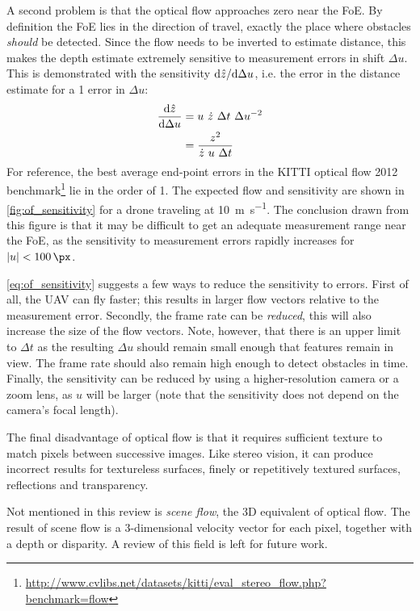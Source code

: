 A second problem is that the optical flow approaches zero near the \ac{FoE}.
By definition the \ac{FoE} lies in the direction of travel, exactly the place where obstacles \emph{should} be detected.
Since the flow needs to be inverted to estimate distance, this makes the depth estimate extremely sensitive to measurement errors in shift $\Delta u$.
This is demonstrated with the sensitivity $\mathrm{d} \hat z / \mathrm{d} \Delta u$, i.e. the error in the distance estimate for a \SI{1}{\px} error in $\Delta u$:
\begin{align}
\frac{\mathrm{d} \hat z}{\mathrm{d} \Delta u} &= u \ \dot z \ \Delta t \ \Delta u^{-2} \\
&= \frac{z^2}{\dot z \ u \ \Delta t} \label{eq:of_sensitivity}
\end{align}
For reference, the best average end-point errors in the KITTI optical flow 2012 benchmark\footnote{\url{http://www.cvlibs.net/datasets/kitti/eval_stereo_flow.php?benchmark=flow}} \cite{Geiger2012} lie in the order of \SI{1}{\px}.
The expected flow and sensitivity are shown in \autoref{fig:of_sensitivity} for a drone traveling at \SI{10}{\meter\per\second}.
The conclusion drawn from this figure is that it may be difficult to get an adequate measurement range near the \ac{FoE}, as the sensitivity to measurement errors rapidly increases for $|u|<\SI{100}{\px}$.

\autoref{eq:of_sensitivity} suggests a few ways to reduce the sensitivity to errors.
First of all, the \ac{UAV} can fly faster; this results in larger flow vectors relative to the measurement error.
Secondly, the frame rate can be \emph{reduced}, this will also increase the size of the flow vectors.
Note, however, that there is an upper limit to $\Delta t$ as the resulting $\Delta u$ should remain small enough that features remain in view.
The frame rate should also remain high enough to detect obstacles in time.
Finally, the sensitivity can be reduced by using a higher-resolution camera or a zoom lens, as $u$ will be larger (note that the sensitivity does not depend on the camera's focal length).

The final disadvantage of optical flow is that it requires sufficient texture to match pixels between successive images.
Like stereo vision, it can produce incorrect results for textureless surfaces, finely or repetitively textured surfaces, reflections and transparency.

\medskip

Not mentioned in this review is \emph{scene flow}, the 3D equivalent of optical flow.
The result of scene flow is a 3-dimensional velocity vector for each pixel, together with a depth or disparity.
A review of this field is left for future work.





